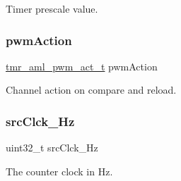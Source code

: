 Timer prescale value. \mbox{\label{group__globals__group_gaf500180d9ca339fd69d69b52db442b74}} 
\subsubsection{\texorpdfstring{pwmAction}{pwmAction}}
{\footnotesize\ttfamily \mbox{\hyperlink{group__enum__group_ga6ce2dec1c04ab59872ebaf44bd4f4682}{tmr\+\_\+aml\+\_\+pwm\+\_\+act\+\_\+t}} pwm\+Action}

Channel action on compare and reload. \mbox{\label{group__globals__group_ga4386243efbc69e706d1811c2e66da6fc}} 
\subsubsection{\texorpdfstring{srcClck\_Hz}{srcClck\_Hz}}
{\footnotesize\ttfamily uint32\+\_\+t src\+Clck\+\_\+\+Hz}

The counter clock in Hz. 
